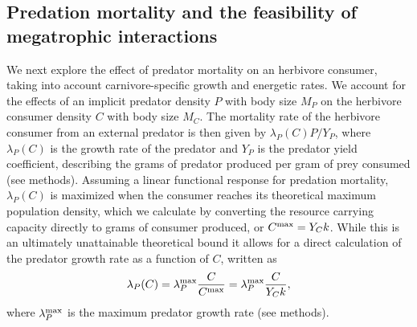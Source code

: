 \documentclass[11pt]{article}
\begin{document}
\subsection*{Predation mortality and the feasibility of megatrophic interactions}

We next explore the effect of predator mortality on an herbivore consumer, taking into account carnivore-specific growth and energetic rates.
We account for the effects of an implicit predator density $P$ with body size $M_P$ on the herbivore consumer density $C$ with body size $M_C$.
The mortality rate of the herbivore consumer from an external predator is then given by $\lambda_P(C) P/Y_P$, where $\lambda_P(C)$ is the growth rate of the predator and $Y_P$ is the predator yield coefficient, describing the grams of predator produced per gram of prey consumed (see methods).
Assuming a linear functional response for predation mortality, $\lambda_P(C)$ is maximized when the consumer reaches its theoretical maximum population density, which we calculate by converting the resource carrying capacity directly to grams of consumer produced, or $C^{\rm max} = Y_C k$.
While this is an ultimately unattainable theoretical bound it allows for a direct calculation of the predator growth rate as a function of $C$, written as
\begin{equation}
    \lambda_P(C) = \lambda_P^{\rm max}\frac{C}{C^{\rm max}} = \lambda_P^{\rm max}\frac{C}{Y_C k},
    \label{eq:predfunction}
\end{equation}
where $\lambda_P^{\rm max}$ is the maximum predator growth rate (see methods). 
\end{document}
